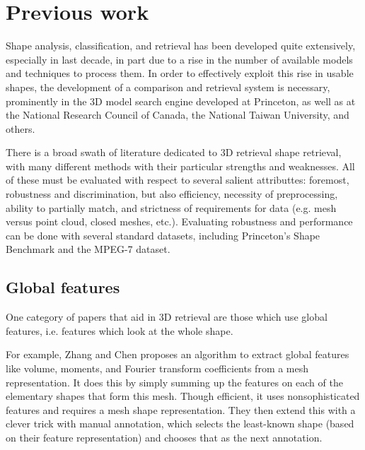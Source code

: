 \documentclass[../tech_report_1.tex]{subfiles}
\begin{document}
\section{Previous work}

Shape analysis, classification, and retrieval has been developed quite extensively, especially in last decade, in part due to a rise in the number of available models and techniques to process them. In order to effectively exploit this rise in usable shapes, the development of a comparison and retrieval system is necessary, prominently in the 3D model search engine developed at Princeton\cite{funkhouser2003search}, as well as at the National Research Council of Canada\cite{paquet2000description}, the National Taiwan University\cite{shen20033d}, and others\cite{suzuki2001search,tangelder2003polyhedral,vranic2003improvement}.

There is a broad swath of literature dedicated to 3D retrieval shape retrieval, with many different methods with their particular strengths and weaknesses. All of these must be evaluated with respect to several salient attributtes: foremost, robustness and discrimination, but also efficiency, necessity of preprocessing, ability to partially match, and strictness of requirements for data (e.g. mesh versus point cloud, closed meshes, etc.). Evaluating robustness and performance can be done with several standard datasets, including Princeton's Shape Benchmark\cite{shilane2004princeton} and the MPEG-7 dataset\cite{jeannin1999description,bober2001mpeg}.

\subsection{Global features}

One category of papers that aid in 3D retrieval are those which use global features, i.e. features which look at the whole shape.

For example, Zhang and Chen\cite{zhang2001efficient} proposes an algorithm to extract global features like volume, moments, and Fourier transform coefficients from a mesh representation. It does this by simply summing up the features on each of the elementary shapes that form this mesh. Though efficient, it uses nonsophisticated features and requires a mesh shape representation. They then extend\cite{zhang2001indexing} this with a clever trick with manual annotation, which selects the least-known shape (based on their feature representation) and chooses that as the next annotation.
\end{document}
